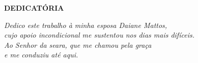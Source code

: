 \newpage
\thispagestyle{empty}

\begin{center}
    \textbf{\MakeUppercase{Dedicatória}}
\end{center}

\vfill

\begin{flushright}
    \textit{Dedico este trabalho à minha esposa Daiane Mattos,\\
    cujo apoio incondicional me sustentou nos dias mais difíceis.\\
    Ao Senhor da seara, que me chamou pela graça\\
    e me conduziu até aqui.}
\end{flushright}
